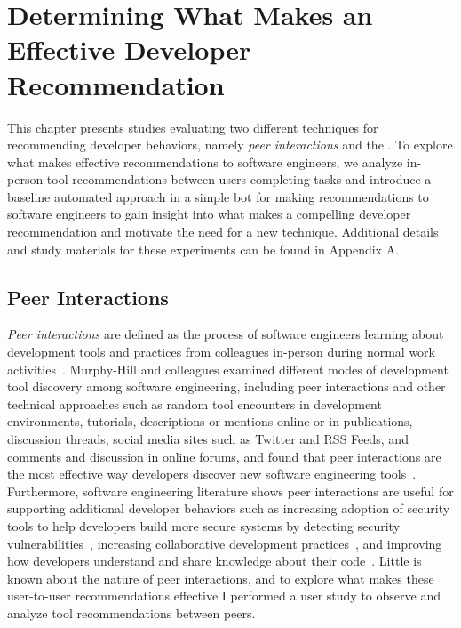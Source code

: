 \chapter{Determining What Makes an Effective Developer Recommendation}
\label{chap-peer}

This chapter presents studies evaluating two different techniques for recommending developer behaviors, namely \textit{peer interactions} and the \tele. To explore what makes effective recommendations to software engineers, we analyze in-person tool recommendations between users completing tasks and introduce a baseline automated approach in a simple bot for making recommendations to software engineers to gain insight into what makes a compelling developer recommendation and motivate the need for a new technique. Additional details and study materials for these experiments can be found in Appendix A.

\section{Peer Interactions}

\textit{Peer interactions} are defined as the process of software engineers learning about development tools and practices from colleagues in-person during normal work activities~\cite{Murphy-Hill2011PeerInteraction}. Murphy-Hill and colleagues examined different modes of development tool discovery among software engineering, including peer interactions and other technical approaches such as random tool encounters in development environments, tutorials, descriptions or mentions online or in publications, discussion threads, social media sites such as Twitter and RSS Feeds, and comments and discussion in online forums, and found that peer interactions are the most effective way developers discover new software engineering tools~\cite{Murphy-Hill2011PeerInteraction}. Furthermore, software engineering literature shows peer interactions are useful for supporting additional developer behaviors such as increasing adoption of security tools to help developers build more secure systems by detecting security vulnerabilities~\cite{Xiao2014Security}, increasing collaborative development practices~\cite{Kalliamvakou15OSSCollaborative}, and improving how developers understand and share knowledge about their code~\cite{Maalej2014CodeComprehension}. Little is known about the nature of peer interactions, and to explore what makes these user-to-user recommendations effective I performed a user study to observe and analyze tool recommendations between peers.

